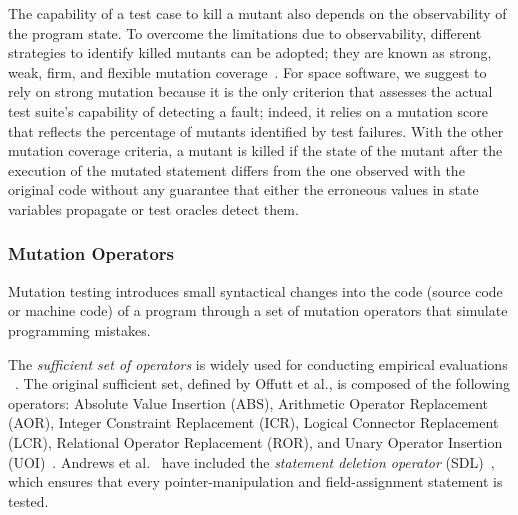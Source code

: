 The capability of a test case to kill a mutant also depends on the observability of the program state. To overcome the limitations due to observability, different strategies to identify killed mutants can be adopted; they are known as strong, weak, firm, and flexible mutation coverage~\cite{ammann2016introduction}. For space software, we suggest to rely on strong mutation because it is the only criterion that assesses the actual test suite's capability of detecting a fault; indeed, it relies on a mutation score that reflects the percentage of mutants identified by test failures. With the other mutation coverage criteria, a mutant is killed if the state of the mutant after the execution of the mutated statement differs from the one observed with the original code without any guarantee that either the erroneous values in state variables propagate or test oracles detect them.




\subsubsection{Mutation Operators}
\label{sec:related:operators}

%


Mutation testing introduces small syntactical changes into the code (source code or machine code) of a program through a set of mutation operators that simulate programming mistakes.

The  \emph{sufficient set of operators} is widely used for conducting empirical evaluations ~\cite{offutt1996experimental,rothermel1996experimental,andrews2005mutation,kintis2017detecting}.
The original sufficient set, defined by Offutt et al., is composed of the following operators: Absolute Value Insertion (ABS), Arithmetic Operator Replacement (AOR), Integer Constraint Replacement (ICR), Logical Connector Replacement (LCR), Relational Operator Replacement (ROR), and Unary Operator Insertion (UOI)~\cite{offutt1996experimental}.
Andrews et al.~\cite{andrews2005mutation} have included the
\emph{statement deletion operator} (SDL)~\cite{delamaro2014designing}, which ensures that every pointer-manipulation and field-assignment statement is tested.

